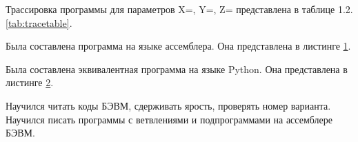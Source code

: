 
Трассировка программы для параметров X=, Y=, Z= представлена в таблице 1.2.\ref{tab:tracetable}.

Была составлена программа на языке ассемблера. Она представлена в листинге \ref{lst:script}.

\begin{figure}[H] %
    \begin{center}
        
    \end{center}
    \label{lst:script}
\end{figure}

Была составлена эквивалентная программа на языке Python. Она представлена в листинге \ref{lst:funcpy}.

\begin{figure}[H] %
    \begin{center}
        
    \end{center}
    \label{lst:funcpy}
\end{figure}

Научился читать коды БЭВМ, сдерживать ярость, проверять номер варианта. Научился писать программы с ветвлениями и подпрограммами на ассемблере БЭВМ.
\newpage





